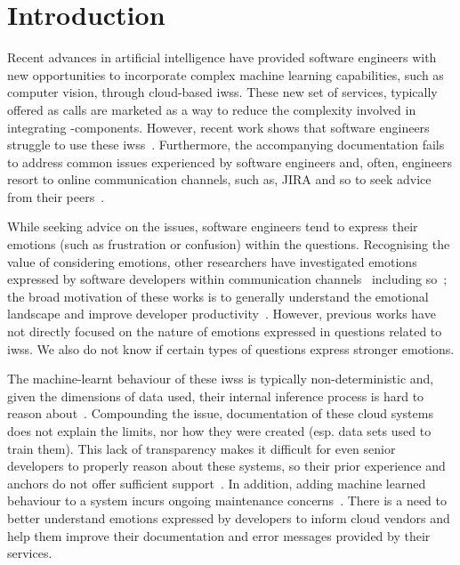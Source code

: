 \section{Introduction}

Recent advances in artificial intelligence have provided software engineers with new opportunities to incorporate complex machine learning capabilities, such as computer vision, through cloud-based \glspl{iws}. These new set of services, typically offered as  calls are marketed as a way to reduce the complexity involved in integrating -components. However, recent work shows that software engineers struggle to use these \glspl{iws}~\citep{Cummaudo:2020icse}. 
Furthermore, the accompanying documentation fails to address common issues experienced by software engineers and, often, engineers resort to online communication channels, such as, JIRA and \gls{so} to seek advice from their peers~\citep{Cummaudo:2020icse}.

While seeking advice on the issues, software engineers tend to express their emotions (such as frustration or confusion) within the questions. Recognising the value of considering emotions, other researchers have investigated emotions expressed by software developers within communication channels~\citep{ortu2016} including \gls{so}~\citep{novielli2018, calefato2018}; the broad motivation of these works is to generally understand the emotional landscape and improve developer productivity~\citep{murgia2014, ortu2016, gachechiladze2017}. However, previous works have not directly focused on the nature of emotions expressed in questions related to \glspl{iws}. We also do not know if certain types of questions express stronger emotions.

The machine-learnt behaviour of these \glspl{iws} is typically non-deterministic and, given the dimensions of data used, their internal inference process is hard to reason about~\citep{Cummaudo:2019icsme}. Compounding the issue, documentation of these cloud systems does not explain the limits, nor how they were created (esp. data sets used to train them). This lack of transparency makes it difficult for even senior developers to properly reason about these systems, so their prior experience and anchors do not offer sufficient support~\citep{Cummaudo:2020icse}. In addition, adding machine learned behaviour to a system incurs ongoing maintenance concerns~\citep{Sculley2015}. There is a need to better understand emotions expressed by developers to inform cloud vendors and help them improve their documentation and error messages provided by their services.

